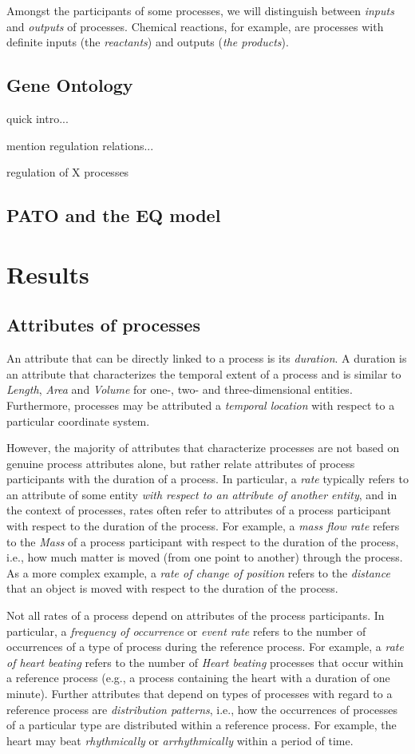\documentclass{bioinfo}
\begin{document}
Amongst the participants of some processes, we will distinguish
between {\em inputs} and {\em outputs} of processes. Chemical
reactions, for example, are processes with definite inputs (the {\em
  reactants}) and outputs ({\em the products}).

\subsection{Gene Ontology}
quick intro...

mention regulation relations... 

regulation of X processes

\subsection{PATO and the EQ model}

\section{Results}
\subsection{Attributes of processes}
An attribute that can be directly linked to a process is its {\em
  duration}. A duration is an attribute that characterizes the
temporal extent of a process and is similar to {\em Length}, {\em
  Area} and {\em Volume} for one-, two- and three-dimensional
entities. Furthermore, processes may be attributed a {\em temporal
  location} with respect to a particular coordinate system.

However, the majority of attributes that characterize processes are
not based on genuine process attributes alone, but rather relate
attributes of process participants with the duration of a process. In
particular, a {\em rate} typically refers to an attribute of some
entity {\em with respect to an attribute of another entity}, and in
the context of processes, rates often refer to attributes of a process
participant with respect to the duration of the process. For example,
a {\em mass flow rate} refers to the {\em Mass} of a process
participant with respect to the duration of the process, i.e., how
much matter is moved (from one point to another) through the process.
As a more complex example, a {\em rate of change of position} refers
to the {\em distance} that an object is moved with respect to the
duration of the process.

Not all rates of a process depend on attributes of the process
participants. In particular, a {\em frequency of occurrence} or {\em
  event rate} refers to the number of occurrences of a type of process
during the reference process. For example, a {\em rate of heart
  beating} refers to the number of {\em Heart beating} processes that
occur within a reference process (e.g., a process containing the heart
with a duration of one minute). Further attributes that depend on
types of processes with regard to a reference process are {\em
  distribution patterns}, i.e., how the occurrences of processes of a
particular type are distributed within a reference process. For
example, the heart may beat {\em rhythmically} or {\em arrhythmically}
within a period of time.
\end{document}
